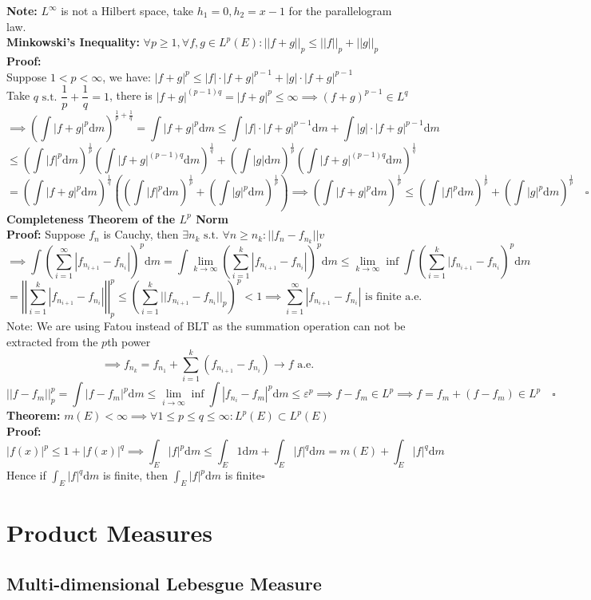 \documentclass{article}
\newcommand{\sumiinf}{\displaystyle\sum_{i=1}^\infty}
\newcommand{\sumik}{\displaystyle\sum_{i=1}^k}
\newcommand{\limiinf}{\displaystyle\lim_{i\to\infty}}
\newcommand{\limkinf}{\displaystyle\lim_{k\to\infty}}
\newcommand{\st}{\mbox{ s.t. }}
\newcommand{\0}{{\bf{0}}}
\newcommand{\1}{{\bf{1}}}
\newcommand{\alev}{\mbox{ a.e.}}
\newcommand{\dint}{\displaystyle\int}
\newcommand{\dif}{\mbox{d}}
\begin{document}
\textbf{Note:} $L^\infty$ is not a Hilbert space, take $h_1=0,h_2=x-1$ for the parallelogram law.\\
\textbf{Minkowski's Inequality:} $\forall p\geq1,\forall f,g\in L^p(E):||f+g||_p\le||f||_p+||g||_p$\\
\textbf{Proof:}\\
Suppose $1<p<\infty$, we have: $|f+g|^p\le|f|\cdot|f+g|^{p-1}+|g|\cdot|f+g|^{p-1}$\\
Take $q\st\dfrac{1}{p}+\dfrac{1}{q}=1$, there is $|f+g|^{(p-1)q}=|f+g|^p\le\infty\implies(f+g)^{p-1}\in L^q$\\
$$\implies(\int|f+g|^p\dif m)^{\frac{1}{p}+\frac{1}{q}}=\int|f+g|^p\dif m\le\int|f|\cdot|f+g|^{p-1}\dif m+\int|g|\cdot|f+g|^{p-1}\dif m$$
$$\le(\int|f|^p\dif m)^\frac{1}{p}(\int|f+g|^{(p-1)q}\dif m)^\frac{1}{q}+(\int|g|\dif m)^\frac{1}{p}(\int|f+g|^{(p-1)q}\dif m)^\frac{1}{q}$$
$$=(\int|f+g|^p\dif m)^\frac{1}{q}\left((\int|f|^p\dif m)^\frac{1}{p}+(\int|g|^p\dif m)^\frac{1}{p}\right)\implies(\int|f+g|^p\dif m)^\frac{1}{p}\le(\int|f|^p\dif m)^\frac{1}{p}+(\int|g|^p\dif m)^\frac{1}{p}\quad\square$$
\textbf{Completeness Theorem of the $L^p$ Norm}\\
\textbf{Proof:} Suppose $f_n$ is Cauchy, then $\exists n_k\st\forall n\geq n_k:||f_n-f_{n_k}||v$
$$\implies\int(\sumiinf|f_{n_{i+1}}-f_{n_i}|)^p\dif m=\int\limkinf(\sumik|f_{n_{i+1}}-f_{n_i}|)^p\dif m\le\limkinf\inf\int(\sumik|f_{n_{i+1}}-f_{n_i})^p\dif m$$
$$=\left|\left|\sumik|f_{n_{i+1}}-f_{n_i}|\right|\right|_p^p\le(\sumik||f_{n_{i+1}}-f_{n_i}||_p)^p<1\implies\sumiinf|f_{n_{i+1}}-f_{n_i}|\mbox{ is finite a.e.}$$
Note: We are using Fatou instead of BLT as the summation operation can not be extracted from the $p$th power
$$\implies f_{n_k}=f_{n_1}+\sumik(f_{n_{i+1}}-f_{n_i})\to f\alev$$
$$||f-f_m||_p^p=\int|f-f_m|^p\dif m\le\limiinf\inf\int|f_{n_i}-f_m|^p\dif m\le\varepsilon^p\implies f-f_m\in L^p\implies f=f_m+(f-f_m)\in L^p\quad\square$$
\textbf{Theorem:} $m(E)<\infty\implies\forall 1\le p\le q\le\infty:L^p(E)\subset L^p(E)$\\
\textbf{Proof:}
$$|f(x)|^p\le1+|f(x)|^q\implies\int_E|f|^p\dif m\le\int_E1\dif m+\int_E|f|^q\dif m=m(E)+\int_E|f|^q\dif m$$
Hence if $\dint_E|f|^q\dif m$ is finite, then $\dint_E|f|^p\dif m$ is finite\quad$\square$
\clearpage
\section{Product Measures}
\subsection{Multi-dimensional Lebesgue Measure}
\end{document}
